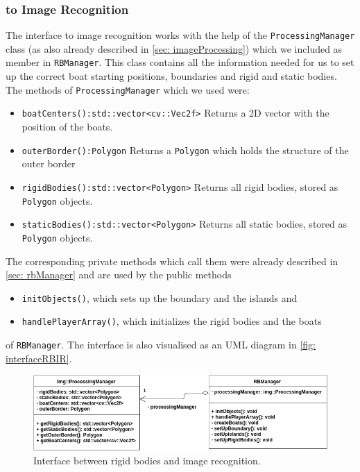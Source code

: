 \subsubsection{to Image Recognition}
\label{sec: interfaceImageRecognition}
The interface to image recognition works with the help of the \texttt{ProcessingManager} class (as also already described in \autoref{sec: imageProcessing}) which we included as member in \texttt{RBManager}. This class contains all the information needed for us to set up the correct boat starting positions, boundaries and rigid and static bodies. The methods of \texttt{ProcessingManager} which we used were:
\begin{itemize}
\item \texttt{boatCenters():std::vector<cv::Vec2f>} Returns a 2D vector with the position of the boats.
\item \texttt{outerBorder():Polygon} Returns a \texttt{Polygon} which holds the structure of the outer border
\item \texttt{rigidBodies():std::vector<Polygon>} Returns all rigid bodies, stored as \texttt{Polygon} objects.
\item \texttt{staticBodies():std::vector<Polygon>} Returns all static bodies, stored as \texttt{Polygon} objects.
\end{itemize} 
The corresponding private methods which call them were already described in \autoref{sec: rbManager} and are used by the public methods
\begin{itemize}
\item \texttt{initObjects()}, which sets up the boundary and the islands and
\item \texttt{handlePlayerArray()}, which initializes the rigid bodies and the boats
\end{itemize}
of \texttt{RBManager}. The interface is also visualised as an UML diagram in \autoref{fig: interfaceRBIR}.
\begin{figure}[ht]
\centering
\includegraphics[scale=0.5]{img/RigidBodies/InterfaceRBImageRecogniton.png}
\caption{Interface between rigid bodies and image recognition.}
\label{fig: interfaceRBIR}
\end{figure}


